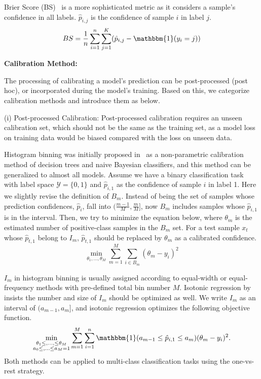 Brier Score (BS)~\cite{brier1950verification} is a more sophisticated metric as it considers a sample's confidence in all labels. $\hat{p}_{i,j}$ is the confidence of sample $i$ in label $j$.
\begin{equation}
    BS=\frac{1}{n}\sum_{i=1}^n\sum_{j=1}^K(\hat{p}_{i,j}-\mathbbm{1}(y_i=j))
\end{equation}

\textbf{Calibration Method:}

The processing of calibrating a model's prediction can be post-processed (post hoc), or incorporated during the model's training. Based on this, we categorize calibration methods and introduce them as below.

(i) Post-processed Calibration:
Post-processed calibration requires an unseen calibration set, which should not be the same as the training set, as a model loss on training data would be biased compared with the loss on unseen data.

Histogram binning was initially proposed in~\cite{zadrozny2001obtaining} as a non-parametric calibration method of decision trees and naive Bayesian classifiers, and this method can be generalized to almost all models. Assume we have a binary classification task with label space $\mathcal{Y} = \{0,1\}$ and $\hat{p}_{i,1}$ as the confidence of sample $i$ in label 1. Here we slightly revise the definition of $B_m$. Instead of being the set of samples whose prediction confidences, $\hat{p}_i$, fall into $(\frac{m-1}{M},\frac{m}{M}]$, now $B_m$ includes samples whose $\hat{p}_{i,1}$ is in the interval. Then, we try to minimize the equation below, where $\theta_m$ is the estimated number of positive-class samples in the $B_m$ set. For a test sample $x_t$ whose $\hat{p}_{t,1}$ belong to $I_m$, $\hat{p}_{t,1}$ should be replaced by $\theta_m$ as a calibrated confidence.
\begin{equation}
    \min_{\theta_1,...,\theta_M}\sum_{m=1}^M\sum_{i\in B_m}(\theta_m-y_i)^2
\end{equation}

$I_m$ in histogram binning is usually assigned according to equal-width or equal-frequency methods with pre-defined total bin number $M$. Isotonic regression by~\cite{zadrozny2002transforming} insists the number and size of $I_m$ should be optimized as well. We write $I_m$ as an interval of $(a_{m-1},a_m]$, and isotonic regression optimizes the following objective function.
\begin{equation}
    \min_{\substack{\theta_1 \leq,...,\leq\theta_M\\a_0\leq,...\leq a_M=1}}\sum_{m=1}^M\sum_{i=1}^n\mathbbm{1}(a_{m-1}\leq \hat{p}_{i,1}\leq a_{m})(\theta_m-y_i)^2.
\end{equation}
Both methods can be applied to multi-class classification tasks using the one-vs-rest strategy.

